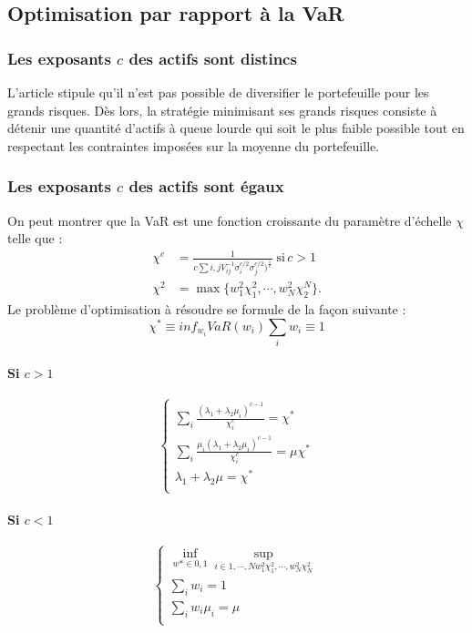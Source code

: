 \documentclass{article}
\begin{document}
      \subsection{Optimisation par rapport à la VaR}
      \subsubsection{Les exposants $c$ des actifs sont distincs}
       L'article stipule qu'il n'est pas possible de diversifier le portefeuille pour les grands risques. Dès lors, la stratégie minimisant ses grands risques consiste à détenir une quantité d'actifs à queue lourde qui soit le plus faible possible tout en respectant les contraintes imposées sur la moyenne du portefeuille.
       \subsubsection{Les exposants $c$ des actifs sont égaux}
     On peut montrer que la VaR est une fonction croissante du paramètre d'échelle $\chi $ telle que :
     \begin{align}
       \chi ^{c} &= \frac{1}{c\sum i,jV_{ij}^{-1}\sigma_{i}^{c/2}\sigma ^{c/2}_{j})^{\frac{1}{c}}}\;\text{si}\, c>1\\
      \chi ^{2} &= \max \lbrace w^{2}_{1}\chi _{1}^{2},\cdots ,w_{N}^{2}\chi ^{N}_{2}\rbrace.
      \end{align}
       Le problème d'optimisation à résoudre se formule de la façon suivante :
       \begin{equation}
       \chi^{*}\equiv inf_{w_{i}}VaR({w_{i}})
       \sum _{i} w_{i}\equiv 1
       \end{equation}
      \paragraph{Si $c>1$}
     \begin{equation}
      \left\{
      \begin{aligned}
     \sum_{i}\frac{(\lambda _{1}+\lambda_{2}\mu _{i})^{c-1}}{\chi _{i}^{c}}=\chi^{*}\\
      \sum_{i}\frac{\mu _{i}(\lambda _{1}+\lambda_{2}\mu _{i})^{c-1}}{\chi _{i}^{c}}=\mu \chi^{*}\\
      \lambda_{1}+\lambda_{2}\mu =\chi ^{*}\\
      \end{aligned}
    \right.
     \end{equation}
      \paragraph{Si $c<1$}
      \begin{equation}
      \left\{
      \begin{aligned}
    \inf_{w*\in {0,1}}{\sup_{i\in {1,\cdots ,N}{w_{1}^{2}\chi ^{2}_{1},\cdots ,w_{N}^{2}\chi ^{2}_{N}}}}\\
      \sum _{i} w_{i}=1\\
      \sum _{i} w_{i}\mu_{i}=\mu\\
      \end{aligned}
    \right.
      \end{equation}
\end{document}
